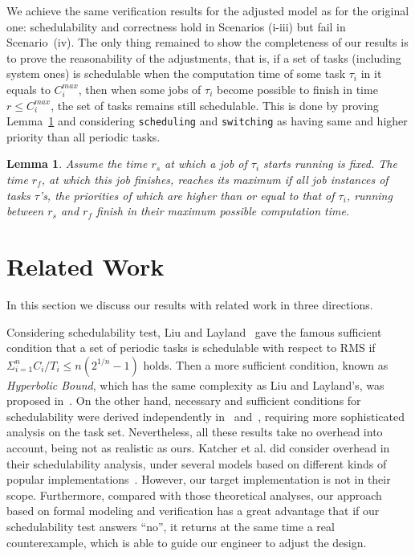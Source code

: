 \documentclass[10pt,journal]{IEEEtran}
\newtheorem{lemma}[theorem]{Lemma}
\begin{document}
{We achieve the same verification results for the adjusted model as for
the original one: schedulability and correctness hold in Scenarios
(i-iii) but fail in Scenario~(iv). The only thing remained to show the
completeness of our results is to prove the reasonability of the
adjustments, that is, if a set of tasks (including system ones) is
schedulable when the computation time of some task $\tau_i$ in it
equals to $C_i^{max}$, then when some jobs of $\tau_i$ become possible
to finish in time $r\le C_i^{max}$, the set of tasks remains still
schedulable. This is done by proving Lemma~\ref{l:max} and considering
\verb|scheduling| and \verb|switching| as having same and higher
priority than all periodic tasks.
\begin{lemma}
\label{l:max}
Assume the time $r_s$ at which a job of $\tau_i$ starts running is
fixed. The time $r_f$, at which this job finishes, reaches its maximum
if all job instances of tasks $\tau$'s, the priorities of which are
higher than or equal to that of $\tau_i$, running between $r_s$ and
$r_f$ finish in their maximum possible computation time.
\end{lemma}
}

\section{Related Work}
\label{s:relate}
In this section we discuss our results with related
work in three directions.

Considering schedulability test, Liu and
Layland~\cite{DBLP:journals/jacm/LiuL73} gave the famous sufficient
condition that a set of periodic tasks is schedulable with respect to
RMS if $\displaystyle \Sigma^n_{i=1} C_i/T_i \le n(2^{1/n}-1)$
holds. Then a more sufficient condition, known as \emph{Hyperbolic
  Bound}, which has the same complexity as Liu and Layland's, was
proposed in~\cite{DBLP:journals/tc/BiniBB03}. On the other hand,
necessary and sufficient conditions for schedulability were derived
independently in~\cite{DBLP:journals/rts/SpruntSL89}
and~\cite{audsley1993deadline}, requiring more sophisticated analysis
on the task set. Nevertheless, all these results take no overhead into
account, being not as realistic as ours. Katcher et al. did consider
overhead in their schedulability analysis, under several models based
on different kinds of popular
implementations~\cite{DBLP:journals/tse/KatcherAS93}.  However, our
target implementation is not in their scope.  Furthermore, compared
with those theoretical analyses, our approach based on formal modeling
and verification has a great advantage that if our schedulability test
answers ``no'', it returns at the same time a real counterexample,
which is able to guide our engineer to adjust the design.
\end{document}
